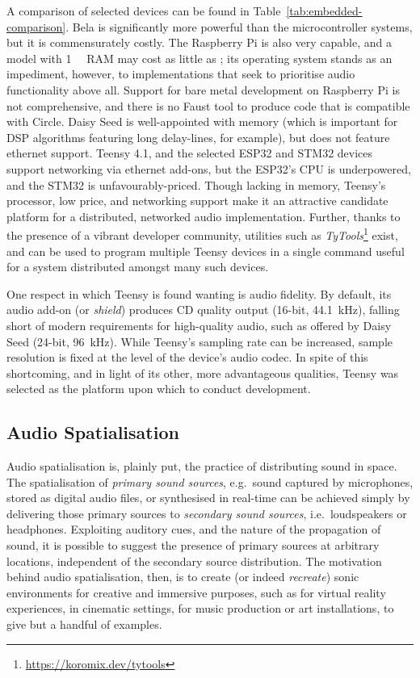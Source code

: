 \documentclass[utf8]{FrontiersinHarvard}
\newcommand{\tabref}[1]{Table~\ref{#1}}
\begin{document}
    A comparison of selected devices can be found in
    \tabref{tab:embedded-comparison}.
    Bela is significantly more powerful than the microcontroller systems, but it is
    commensurately costly.
    The Raspberry Pi is also very capable, and a model with \qty{1}{\giga\byte} RAM
    may cost as little as ;
    its operating system stands as an impediment, however, to implementations that
    seek to prioritise audio functionality above all.
    Support for bare metal development on Raspberry Pi is not comprehensive, and
    there is no Faust tool to produce code that is compatible with Circle.
    Daisy Seed is well-appointed with memory (which is important for DSP algorithms
    featuring long delay-lines, for example), but does not feature ethernet support.
    Teensy 4.1, and the selected ESP32 and STM32 devices support networking via
    ethernet add-ons, but the ESP32's CPU is underpowered, and the STM32 is
    unfavourably-priced.
    Though lacking in memory, Teensy's processor, low price, and networking support
    make it an attractive candidate platform for a distributed, networked audio
    implementation.
    Further, thanks to the presence of a vibrant developer community, utilities such
    as \textit{TyTools}\footnote{\url{https://koromix.dev/tytools}} exist, and can
    be used to program multiple Teensy devices in a single command \textemdash{}
    useful for a system distributed amongst many such devices.

    One respect in which Teensy is found wanting is audio fidelity.
    By default, its audio add-on (or \textit{shield}) produces CD quality output
    (16-bit, \qty{44.1}{\kHz}), falling short of modern requirements for
    high-quality audio, such as offered by Daisy Seed (24-bit, \qty{96}{\kHz}).
    While Teensy's sampling rate can be increased, sample resolution is fixed at
    the level of the device's audio codec.
    In spite of this shortcoming, and in light of its other, more advantageous
    qualities, Teensy was selected as the platform upon which to conduct
    development.

    \subsection{Audio Spatialisation}\label{subsec:audio-spatialisation}

    Audio spatialisation is, plainly put, the practice of distributing sound in
    space.
    The spatialisation of \textit{primary sound sources}, e.g.\ sound
    captured by microphones, stored as digital audio files, or synthesised in
    real-time can be achieved simply by delivering those primary sources to
    \textit{secondary sound sources}, i.e.\ loudspeakers or headphones.
    Exploiting auditory cues, and the nature of the propagation of sound, it is
    possible to suggest the presence of primary sources at arbitrary locations,
    independent of the secondary source distribution.
    The motivation behind audio spatialisation, then, is to create (or indeed
    \textit{recreate}) sonic environments for creative and immersive purposes,
    such as for virtual reality experiences, in cinematic settings, for music
    production or art installations, to give but a handful of examples.
\end{document}
